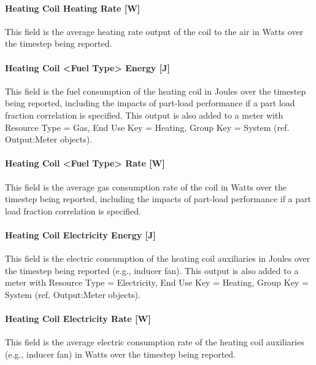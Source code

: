 \paragraph{Heating Coil Heating Rate {[}W{]}}\label{heating-coil-heating-rate-w-6}

This field is the average heating rate output of the coil to the air in Watts over the timestep being reported.

\paragraph{Heating Coil <Fuel Type> Energy {[}J{]}}\label{heating-coil-gas-energy-j}

This field is the fuel consumption of the heating coil in Joules over the timestep being reported, including the impacts of part-load performance if a part load fraction correlation is specified. This output is also added to a meter with Resource Type = Gas, End Use Key = Heating, Group Key = System (ref. Output:Meter objects).

\paragraph{Heating Coil <Fuel Type> Rate {[}W{]}}\label{heating-coil-gas-rate-w}

This field is the average gas consumption rate of the coil in Watts over the timestep being reported, including the impacts of part-load performance if a part load fraction correlation is specified.

\paragraph{Heating Coil Electricity Energy {[}J{]}}\label{heating-coil-electric-energy-j-2}

This field is the electric consumption of the heating coil auxiliaries in Joules over the timestep being reported (e.g., inducer fan). This output is also added to a meter with Resource Type = Electricity, End Use Key = Heating, Group Key = System (ref. Output:Meter objects).

\paragraph{Heating Coil Electricity Rate {[}W{]}}\label{heating-coil-electric-power-w-3}

This field is the average electric consumption rate of the heating coil auxiliaries (e.g., inducer fan) in Watts over the timestep being reported.

